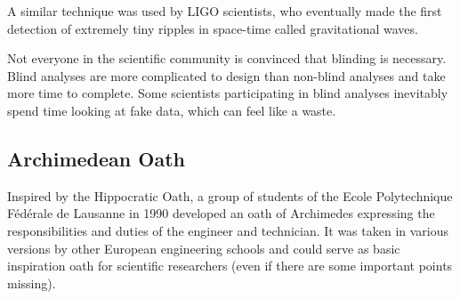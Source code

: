 	A similar technique was used by LIGO scientists, who eventually made the first detection of extremely tiny ripples in space-time called gravitational waves.

	Not everyone in the scientific community is convinced that blinding is necessary. Blind analyses are more complicated to design than non-blind analyses and take more time to complete. Some scientists participating in blind analyses inevitably spend time looking at fake data, which can feel like a waste.
	
	\pagebreak
	\subsection{Archimedean Oath}
	Inspired by the Hippocratic Oath, a group of students of the Ecole Polytechnique Fédérale de Lausanne in 1990 developed an oath of Archimedes expressing the responsibilities and duties of the engineer and technician. It was taken in various versions by other European engineering schools and could serve as basic inspiration oath for scientific researchers (even if there are some important points missing).

